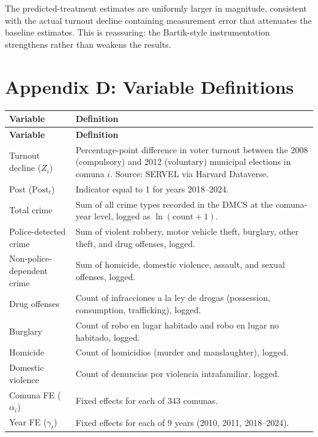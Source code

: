 \documentclass[12pt]{article}
\begin{document}
The predicted-treatment estimates are uniformly larger in magnitude, consistent with the actual turnout decline containing measurement error that attenuates the baseline estimates. This is reassuring: the Bartik-style instrumentation strengthens rather than weakens the results.


\setcounter{table}{0}
\setcounter{figure}{0}
\section*{Appendix D: Variable Definitions}

\begin{longtable}{p{4cm}p{10cm}}
\toprule
\textbf{Variable} & \textbf{Definition} \\
\midrule
\endfirsthead
\toprule
\textbf{Variable} & \textbf{Definition} \\
\midrule
\endhead
\bottomrule
\endfoot
Turnout decline ($Z_i$) & Percentage-point difference in voter turnout between the 2008 (compulsory) and 2012 (voluntary) municipal elections in comuna $i$. Source: SERVEL via \citet{Cox2022} Harvard Dataverse. \\
Post ($\text{Post}_t$) & Indicator equal to 1 for years 2018--2024. \\
Total crime & Sum of all crime types recorded in the DMCS at the comuna-year level, logged as $\ln(\text{count}+1)$. \\
Police-detected crime & Sum of violent robbery, motor vehicle theft, burglary, other theft, and drug offenses, logged. \\
Non-police-dependent crime & Sum of homicide, domestic violence, assault, and sexual offenses, logged. \\
Drug offenses & Count of infracciones a la ley de drogas (possession, consumption, trafficking), logged. \\
Burglary & Count of robo en lugar habitado and robo en lugar no habitado, logged. \\
Homicide & Count of homicidios (murder and manslaughter), logged. \\
Domestic violence & Count of denuncias por violencia intrafamiliar, logged. \\
Comuna FE ($\alpha_i$) & Fixed effects for each of 343 comunas. \\
Year FE ($\gamma_t$) & Fixed effects for each of 9 years (2010, 2011, 2018--2024). \\
\end{longtable}
\end{document}
